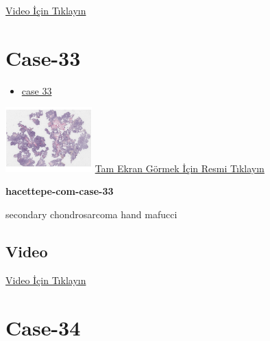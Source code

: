 \documentclass[
  letterpaper,
  DIV=11,
  numbers=noendperiod]{scrreprt}
\providecommand{\tightlist}{%
  \setlength{\itemsep}{0pt}\setlength{\parskip}{0pt}}\usepackage{longtable,booktabs,array}
\begin{document}
\href{https://www.youtube.com/watch?v=mnLIi1sNnlQ}{Video İçin Tıklayın}

\hypertarget{sec-hacettepe-case-of-the-month-case-33}{%
\section{Case-33}\label{sec-hacettepe-case-of-the-month-case-33}}

\begin{itemize}
\tightlist
\item
  \href{https://www.youtube.com/watch?v=iWDCr1XysLk\&ab_channel=KemalKosemehmetoglu}{case
  33}
\end{itemize}

\href{https://images.patolojiatlasi.com/hacettepe-com-case-33/HE.html}{\includegraphics[width=0.25\textwidth,height=\textheight]{./screenshots/hacettepe-com-case-33_screenshot.png}}
\href{https://images.patolojiatlasi.com/hacettepe-com-case-33/HE.html}{Tam
Ekran Görmek İçin Resmi Tıklayın}

\textbf{hacettepe-com-case-33}

\begin{tcolorbox}[enhanced jigsaw, left=2mm, toprule=.15mm, rightrule=.15mm, bottomrule=.15mm, leftrule=.75mm, colback=white, colframe=quarto-callout-tip-color-frame, toptitle=1mm, breakable, titlerule=0mm, colbacktitle=quarto-callout-tip-color!10!white, bottomtitle=1mm, title=\textcolor{quarto-callout-tip-color}{\faLightbulb}\hspace{0.5em}{Tanı}, arc=.35mm, opacitybacktitle=0.6, opacityback=0, coltitle=black]

secondary chondrosarcoma hand mafucci

\end{tcolorbox}

\hypertarget{video-31}{%
\subsection{Video}\label{video-31}}

\href{https://www.youtube.com/watch?v=iWDCr1XysLk}{Video İçin Tıklayın}

\hypertarget{sec-hacettepe-case-of-the-month-case-34}{%
\section{Case-34}\label{sec-hacettepe-case-of-the-month-case-34}}
\end{document}

